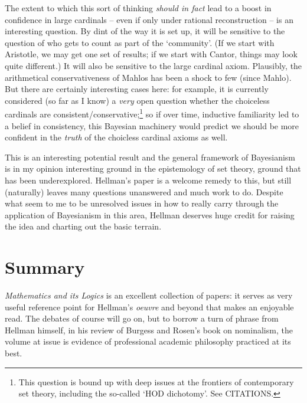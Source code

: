 \documentclass{amsart}
\theoremstyle{definition}
\begin{document}
The extent to which this sort of thinking \emph{should in fact} lead to a boost 
in confidence in large cardinals -- even if only under rational reconstruction --
is an interesting question. By dint of the way it is set up, it will be sensitive to 
the question of who gets to count as part of the `community'. (If we start with 
Aristotle, we may get one set of results; 
if we start with Cantor, things may look quite different.) It will also 
be sensitive to the large cardinal axiom. Plausibly, the arithmetical conservativeness of 
Mahlos has been a shock to few (since Mahlo). But there are certainly 
interesting cases here: for example, it is currently considered (so far as I 
know) a \emph{very} open question whether the choiceless cardinals 
are consistent/conservative;\footnote{
    This question is bound up with deep issues at the frontiers of 
    contemporary set theory, including the so-called `HOD dichotomy'.
    See CITATIONS.
} 
so if over time, inductive familiarity led to a belief in consistency, this Bayesian 
machinery would predict we should be more confident in the \emph{truth} of the 
choicless cardinal axioms as well. 

This is an interesting potential result and the general framework of 
Bayesianism is in my opinion interesting ground in the epistemology of set theory,
ground that has been underexplored. Hellman's paper is a welcome remedy to this,
but still (naturally) leaves many questions unanswered and much work to do. Despite 
what seem to me to be unresolved issues in how to really carry through the application
of Bayesianism in this area, Hellman deserves huge credit for raising the idea 
and charting out the basic terrain.

\section*{Summary}
\emph{Mathematics and its Logics} is an excellent collection of papers: it serves 
as very useful reference point for Hellman's \emph{oeuvre} and beyond that 
makes an enjoyable read. The debates of course will go on, but to borrow 
a turn of phrase from Hellman himself, in his review of Burgess and Rosen's 
book on nominalism, the volume at issue is evidence of professional academic
philosophy practiced at its best. 

%
\end{document}

